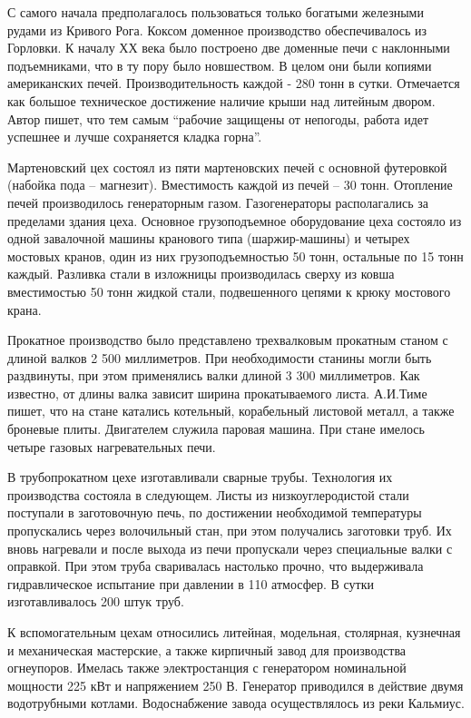 
С самого начала предполагалось пользоваться только богатыми железными рудами из
Кривого Рога. Коксом доменное производство обеспечивалось из Горловки. К началу
ХХ века было построено две доменные печи с наклонными подъемниками, что в ту
пору было новшеством. В целом они были копиями американских печей.
Производительность каждой -  280 тонн в сутки. Отмечается как большое
техническое достижение наличие крыши над литейным двором. Автор пишет, что тем
самым \enquote{рабочие защищены от непогоды, работа идет успешнее и лучше сохраняется
кладка горна}.

Мартеновский цех  состоял из пяти мартеновских печей с основной футеровкой
(набойка  пода – магнезит). Вместимость каждой из печей – 30 тонн. Отопление
печей производилось генераторным газом. Газогенераторы располагались за
пределами здания цеха. Основное грузоподъемное оборудование цеха состояло из
одной завалочной машины кранового типа (шаржир-машины) и четырех мостовых
кранов, один из них грузоподъемностью 50 тонн, остальные по 15 тонн каждый.
Разливка стали в изложницы производилась сверху из ковша вместимостью 50 тонн
жидкой стали, подвешенного цепями к крюку мостового крана.

Прокатное производство было представлено трехвалковым прокатным станом с длиной
валков 2 500 миллиметров. При необходимости станины могли быть  раздвинуты, при
этом применялись валки длиной 3 300 миллиметров. Как известно, от длины валка
зависит ширина прокатываемого листа. А.И.Тиме пишет, что на стане катались
котельный, корабельный листовой металл, а также броневые плиты. Двигателем
служила паровая машина. При стане имелось четыре газовых нагревательных печи.

В трубопрокатном цехе изготавливали сварные трубы. Технология их производства
состояла в следующем.  Листы из низкоуглеродистой  стали поступали в
заготовочную печь, по достижении необходимой температуры  пропускались через
волочильный стан, при этом получались заготовки труб. Их вновь нагревали  и
после выхода из печи пропускали через специальные валки с оправкой. При этом
труба сваривалась настолько прочно, что выдерживала гидравлическое испытание
при давлении в 110 атмосфер. В сутки изготавливалось 200 штук труб.

К вспомогательным цехам относились литейная, модельная, столярная,  кузнечная и
механическая мастерские, а также кирпичный завод для производства огнеупоров.
Имелась также электростанция с генератором номинальной мощности 225 кВт и
напряжением 250 В. Генератор приводился в действие двумя водотрубными котлами.
Водоснабжение завода осуществлялось из реки Кальмиус.

